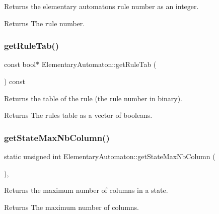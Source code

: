 Returns the elementary automaton\textquotesingle{}s rule number as an integer.

\begin{DoxyReturn}{Returns}
The rule number. 
\end{DoxyReturn}
\mbox{\label{class_elementary_automaton_a585b7a59111245096079cf52bd4dbe96}} 
\subsubsection{\texorpdfstring{get\+Rule\+Tab()}{getRuleTab()}}
{\footnotesize\ttfamily const bool$\ast$ Elementary\+Automaton\+::get\+Rule\+Tab (\begin{DoxyParamCaption}{ }\end{DoxyParamCaption}) const\hspace{0.3cm}{\ttfamily [inline]}}

Returns the table of the rule (the rule number in binary).

\begin{DoxyReturn}{Returns}
The rule\textquotesingle{}s table as a vector of booleans. 
\end{DoxyReturn}
\mbox{\label{class_elementary_automaton_abbe236c9f41be00593ae8f4142f353df}} 
\subsubsection{\texorpdfstring{get\+State\+Max\+Nb\+Column()}{getStateMaxNbColumn()}}
{\footnotesize\ttfamily static unsigned int Elementary\+Automaton\+::get\+State\+Max\+Nb\+Column (\begin{DoxyParamCaption}{ }\end{DoxyParamCaption})\hspace{0.3cm}{\ttfamily [inline]}, {\ttfamily [static]}}

Returns the maximum number of columns in a state.

\begin{DoxyReturn}{Returns}
The maximum number of columns. 
\end{DoxyReturn}
\mbox{\label{class_elementary_automaton_adb3f06c908a1550bd236fffe997b0180}} 
